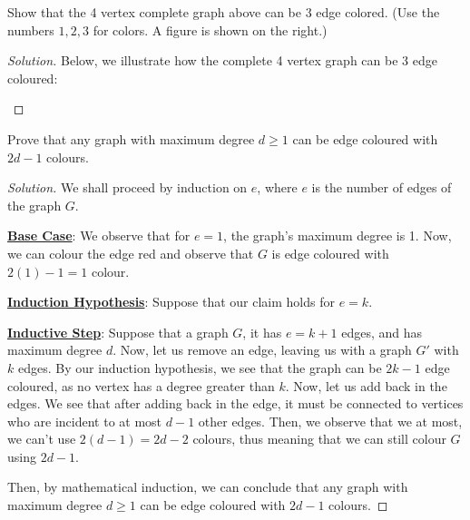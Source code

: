 \documentclass{article}
\newenvironment{solution}{\begin{proof}[Solution]}{\end{proof}}
\begin{document}
\begin{hw}
	Show that the 4 vertex complete graph above can be 3 edge colored. (Use the numbers $1,2,3$ for colors. A figure is shown on the right.)
\end{hw}
\begin{solution}
	Below, we illustrate how the complete 4 vertex graph can be 3 edge coloured: 
	\begin{center}
	\end{center}
\end{solution}

\begin{hw}
	Prove that any graph with maximum degree $d \geq 1$ can be edge coloured with $2d-1$ colours. 
\end{hw}
\begin{solution}
	We shall proceed by induction on $e$, where $e$ is the number of edges of the graph $G$.
	
	\textbf{\underline{Base Case}}: We observe that for $e=1$, the graph's maximum degree is 1. Now, we can colour the edge red and observe that $G$ is edge coloured with $2(1)-1=1$ colour.
	
	\textbf{\underline{Induction Hypothesis}}: Suppose that our claim holds for $e=k$.
	
	\textbf{\underline{Inductive Step}}: Suppose that a graph $G$, it has $e=k+1$ edges, and has maximum degree $d$. Now, let us remove an edge, leaving us with a graph $G'$ with $k$ edges. By our induction hypothesis, we see that the graph can be $2k-1$ edge coloured, as no vertex has a degree greater than $k$. Now, let us add back in the edges. We see that after adding back in the edge, it must be connected to vertices who are incident to at most $d-1$ other edges. Then, we observe that we at most, we can't use $2(d-1)=2d-2$ colours, thus meaning that we can still colour $G$ using $2d-1$.
	
	Then, by mathematical induction, we can conclude that any graph with maximum degree $d \geq 1$ can be edge coloured with $2d-1$ colours.
\end{solution}
\end{document}
